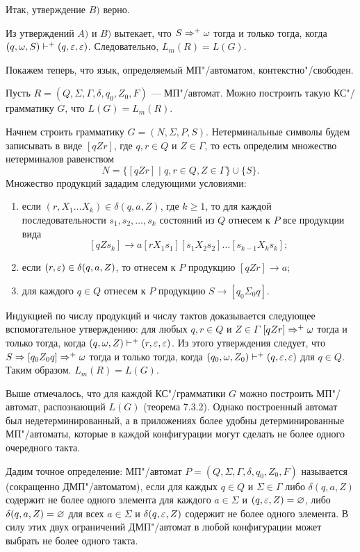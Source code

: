 \begin{myproof}
Итак, утверждение $B)$ верно.

Из утверждений $A)$ и $B)$ вытекает, что $S\Rightarrow^+\omega$ тогда и только тогда, когда $(q,\omega,S)\vdash^+(q,\varepsilon,\varepsilon)$. Следовательно, $L_m(R)=L(G)$.
\end{myproof}

Покажем теперь, что язык, определяемый МП"/автоматом, контекстно"/свободен.

\begin{mytheorem}
Пусть $R=(Q,\Sigma,\Gamma,\delta,q_0,Z_0,F)$ --- МП"/автомат. Можно построить такую КС"/грамматику $G$, что $L(G)=L_m(R)$.
\end{mytheorem}

\begin{myproof}
Начнем строить грамматику $G=(N,\Sigma,P,S)$. Нетерминальные символы будем записывать в виде $[qZr]$, где $q,r\in Q$ и $Z\in\Gamma$, то есть определим множество нетерминалов равенством
\[
N =\{[qZr]\mid q,r\in Q, Z\in\Gamma\} \cup \{S\}.
\]
Множество продукций зададим следующими условиями:
\begin{enumerate}
\item если $(r,X_1\ldots X_k)\in\delta(q,a,Z)$, где $k\ge 1$, то для каждой последовательности $s_1, s_2, \ldots , s_k$ состояний из $Q$ отнесем к $P$ все продукции вида
\[
[qZs_k] \to a[rX_1s_1][s_1X_2s_2]\ldots [s_{k-1}X_ks_k];
\]
\item если $(r,\varepsilon)\in\delta(q,a,Z)$, то отнесем к $P$ продукцию $[qZr]\to a$; \\
\item для каждого $q\in Q$ отнесем к $P$ продукцию $S\to[q_0\Sigma_0q]$.
\end{enumerate}

Индукцией по числу продукций и числу тактов доказывается следующее вспомогательное утверждению: для любых $q,r\in Q$ и $Z\in\Gamma$ $[qZr]\Rightarrow^+\omega$ тогда и только тогда, когда $(q,\omega,Z)\vdash^+(r,\varepsilon,\varepsilon)$. Из этого утверждения следует, что $S\Rightarrow[q_0Z_0q]\Rightarrow^+\omega$ тогда и только тогда, когда $(q_0,\omega,Z_0)\vdash^+(q,\varepsilon,\varepsilon)$ для $q\in Q$. Таким образом. $L_m(R)=L(G)$.
\end{myproof}

Выше отмечалось, что для каждой КС"/грамматики $G$ можно построить МП"/автомат, распознающий $L(G)$ (теорема 7.3.2). Однако построенный автомат был недетерминированный, а в приложениях более удобны детерминированные МП"/автоматы, которые в каждой конфигурации могут сделать не более одного очередного такта.

Дадим точное определение: МП"/автомат $P=(Q,\Sigma,\Gamma,\delta,q_0,Z_0,F)$ называется  (сокращенно ДМП"/автоматом), если для каждых $q\in Q$ и $\Sigma\in\Gamma$ либо $\delta(q,a,Z)$ содержит не более одного элемента для каждого $a\in\Sigma$ и $(q,\varepsilon,Z)=\varnothing$, либо $\delta(q,a,Z)=\varnothing$ для всех $a\in\Sigma$ и $\delta(q,\varepsilon,Z)$ содержит не более одного элемента. В силу этих двух ограничений ДМП"/автомат в любой конфигурации может выбрать не более одного такта.

